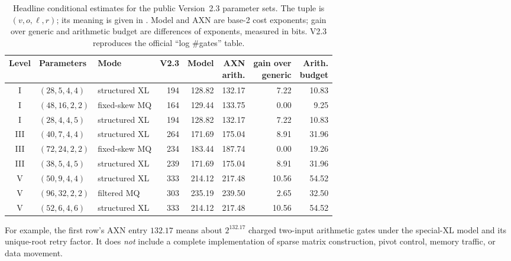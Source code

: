 \documentclass[11pt]{article}
\begin{document}
\begin{table}[H]
\centering
\caption{Headline conditional estimates for the public Version~2.3 parameter
sets.  The tuple is $(v,o,\ell,r)$; its meaning is given in
.  Model and AXN are base-2 cost exponents; gain over generic
and arithmetic budget are differences of exponents, measured in bits.  V2.3
reproduces the official ``log \#gates'' table.}
\label{tab:main}
\footnotesize
\setlength{\tabcolsep}{2.3pt}
\renewcommand{\arraystretch}{1.08}
\begin{tabular}{@{}c l l r r r r r@{}}
\toprule
Level & Parameters & Mode & V2.3 & Model & \shortstack{AXN\\arith.} &
\shortstack{gain over\\generic} & \shortstack{Arith.\\budget}\\
\midrule
I   & $(28,5,4,4)$  & structured XL & 194 & 128.82 & 132.17 &  7.22 & 10.83\\
I   & $(48,16,2,2)$ & fixed-skew MQ & 164 & 129.44 & 133.75 &  0.00 &  9.25\\
I   & $(28,4,4,5)$  & structured XL & 194 & 128.82 & 132.17 &  7.22 & 10.83\\
\midrule
III & $(40,7,4,4)$  & structured XL & 264 & 171.69 & 175.04 &  8.91 & 31.96\\
III & $(72,24,2,2)$ & fixed-skew MQ & 234 & 183.44 & 187.74 &  0.00 & 19.26\\
III & $(38,5,4,5)$  & structured XL & 239 & 171.69 & 175.04 &  8.91 & 31.96\\
\midrule
V   & $(50,9,4,4)$  & structured XL & 333 & 214.12 & 217.48 & 10.56 & 54.52\\
V   & $(96,32,2,2)$ & filtered MQ   & 303 & 235.19 & 239.50 &  2.65 & 32.50\\
V   & $(52,6,4,6)$  & structured XL & 333 & 214.12 & 217.48 & 10.56 & 54.52\\
\bottomrule
\end{tabular}
\end{table}

For example, the first row's AXN entry $132.17$ means about $2^{132.17}$
charged two-input arithmetic gates under the special-XL model and its
unique-root retry factor.  It does \emph{not} include a complete implementation
of sparse matrix construction, pivot control, memory traffic, or data
movement.
\end{document}
